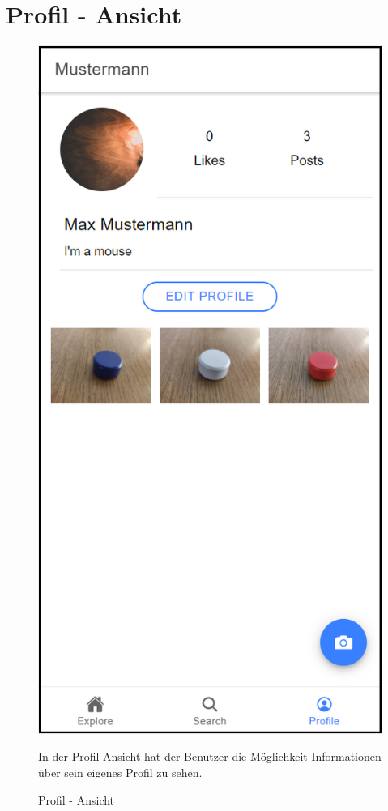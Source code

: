 \section{Profil - Ansicht\label{sec4.2:Unterpunkt-2}}

\begin{figure}[H]
    \centering
    \begin{minipage}{.4\textwidth}
        \begin{center}
            \includegraphics[width=0.8\linewidth]{images/profil.png}
        \end{center}
        \caption{Profil - Ansicht}
        \label{fig:profil}
    \end{minipage}%
    \begin{minipage}{.6\textwidth}
        \begin{changemargin}{0.5cm}{0cm}            
            In der Profil-Ansicht hat der Benutzer die Möglichkeit Informationen über sein eigenes Profil zu sehen.


\end{changemargin}
\end{minipage}
\end{figure}

